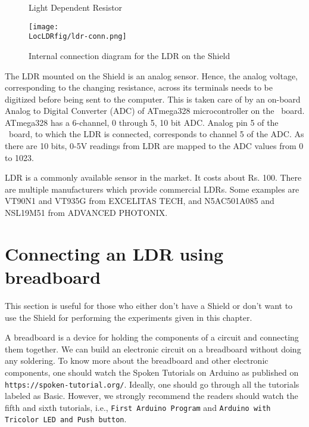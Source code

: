 \begin{figure}
  \centering
   \hfill
  \caption{Light Dependent Resistor}
\end{figure}

\begin{figure}
  \centering
  \texttt{[image: \\LocLDRfig/ldr-conn.png]}
  \caption{Internal connection diagram for the LDR on the Shield}
  \label{fig:ldrconn}
\end{figure}

The LDR mounted on the Shield is an analog sensor. Hence, the analog voltage, corresponding to the changing resistance, across its terminals needs to be digitized before being sent to the computer. This is taken care of by an on-board Analog to Digital Converter (ADC) of ATmega328 microcontroller on the \arduino\
board. ATmega328 has a 6-channel, 0 through 5, 10 bit ADC. Analog pin
5 of the \arduino\ board, to which the LDR is connected, corresponds
to channel 5 of the ADC.  As there are 10 bits, 0-5V readings from LDR
are mapped to the ADC values from 0 to 1023. 

LDR is a commonly available sensor in the market. It costs about
Rs. 100. There are multiple manufacturers which provide commercial
LDRs.  Some examples are VT90N1 and VT935G from EXCELITAS TECH, and
N5AC501A085 and NSL19M51 from ADVANCED PHOTONIX. 

\section{Connecting an LDR using breadboard}
This section is useful for those who either don't have a Shield or don't want to use the Shield
for performing the experiments given in this chapter.

A breadboard is a device for holding the components of a circuit and connecting 
them together. We can build an electronic circuit on a breadboard without doing any 
soldering. To know more about the breadboard and other electronic components, 
one should watch the Spoken Tutorials on Arduino as published on
  {\tt https://spoken-tutorial.org/}. Ideally, one should go through all the
tutorials labeled as Basic. However, we strongly recommend the readers should
watch the fifth and sixth tutorials, i.e., {\tt First Arduino Program} and 
  {\tt Arduino with Tricolor LED and Push button}.

